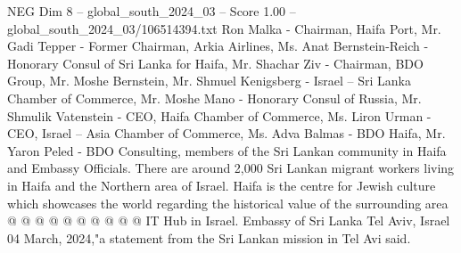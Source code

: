 \begin{textsample}{NEG Dim 8 – global\_south\_2024\_03 – Score 1.00 – global\_south\_2024\_03/106514394.txt}
Ron Malka - Chairman, Haifa Port, Mr.
Gadi Tepper - Former Chairman, Arkia Airlines, Ms.
Anat Bernstein-Reich - Honorary Consul of Sri Lanka for Haifa, Mr.
Shachar Ziv - Chairman, BDO Group, Mr.
Moshe Bernstein, Mr.
Shmuel Kenigsberg - Israel -- Sri Lanka Chamber of Commerce, Mr.
Moshe Mano - Honorary Consul of Russia, Mr.
Shmulik Vatenstein - CEO, Haifa Chamber of Commerce, Ms.
Liron Urman - CEO, Israel -- Asia Chamber of Commerce, Ms.
Adva Balmas - BDO Haifa, Mr.
Yaron Peled - BDO Consulting, members of the Sri Lankan community in Haifa and Embassy Officials.
There are around 2,000 Sri Lankan migrant workers living in Haifa and the Northern area of Israel.
Haifa is the centre for Jewish culture which showcases the world regarding the historical value of the surrounding area @ @ @ @ @ @ @ @ @ @ IT Hub in Israel.
Embassy of Sri Lanka Tel Aviv, Israel 04 March, 2024,"a statement from the Sri Lankan mission in Tel Avi said.

\end{textsample}
